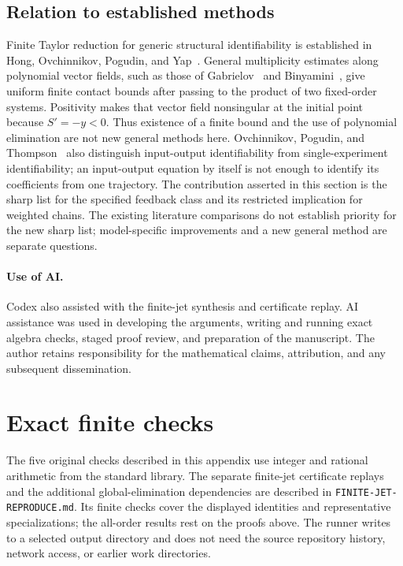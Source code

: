 \documentclass[11pt]{article}
\theoremstyle{remark}\newtheorem{remark}[theorem]{Remark}
\begin{document}
\subsection{Relation to established methods}
Finite Taylor reduction for generic structural identifiability is
established in Hong, Ovchinnikov, Pogudin, and Yap~\cite{FJHOPY}.
General multiplicity estimates along polynomial vector fields, such as
those of Gabrielov~\cite{FJGAB} and Binyamini~\cite{FJBIN}, give uniform
finite contact bounds after passing to the product of two fixed-order
systems. Positivity makes that vector field nonsingular at the initial
point because $S'=-y<0$. Thus existence of a finite bound and the use
of polynomial elimination are not new general methods here.
Ovchinnikov, Pogudin, and Thompson~\cite{FJOPT} also distinguish
input-output identifiability from single-experiment identifiability;
an input-output equation by itself is not enough to identify its
coefficients from one trajectory.
The contribution asserted in this section is the sharp list for the
specified feedback class and its restricted implication for weighted
chains. The existing literature comparisons do not establish priority
for the new sharp list; model-specific improvements and a new general
method are separate questions.

\paragraph{Use of AI.}
Codex also assisted with the finite-jet synthesis and certificate replay. AI assistance was used in developing the arguments, writing and running exact algebra checks, staged proof review, and preparation of the manuscript. The author retains responsibility for the mathematical claims, attribution, and any subsequent dissemination.

\appendix
\section{Exact finite checks}\label{app:checks}
The five original checks described in this appendix use integer and rational arithmetic from the standard library. The separate finite-jet certificate replays and the additional global-elimination dependencies are described in \texttt{FINITE-JET-REPRODUCE.md}. Its finite checks cover the displayed identities and representative specializations; the all-order results rest on the proofs above. The runner writes to a selected output directory and does not need the source repository history, network access, or earlier work directories.
\end{document}
